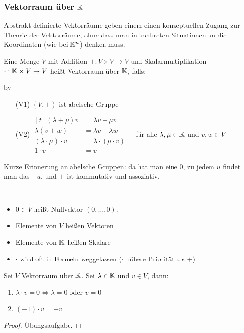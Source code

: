 \subsubsection{Vektorraum über $ \mathbb K $}

Abstrakt definierte Vektorräume geben einem einen konzeptuellen Zugang zur Theorie der Vektorräume, ohne dass man in konkreten Situationen an die Koordinaten (wie bei $\mathbb K^n$) denken muss. 

Eine Menge $ V $ mit Addition $ + : V \times V \to V  $ und Skalarmultiplikation $ \cdot : \mathbb K \times V \to V $ heißt Vektorraum über $ \mathbb K $, falls:

\advance\myindent by \the{}

\begin{itemize}[leftmargin=\myindent]
	\item[(V1)]
		$ (V,+) $ ist abelsche Gruppe
	\item[(V2)]
		$ \begin{aligned}[t]
			(\lambda + \mu)v &= \lambda v + \mu v & \\
			\lambda (v + w) &= \lambda v + \lambda w \\
			(\lambda \cdot \mu) \cdot v &= \lambda \cdot (\mu \cdot v) \\
			1 \cdot v &= v
		\end{aligned} $
		für alle $\lambda, \mu \in \mathbb K$ und $v, w\in V$
\end{itemize}

Kurze Erinnerung an abelsche Gruppen: da hat man eine $0$, zu jedem $u$ findet man das $-u$, und $+$ ist kommutativ und assoziativ. 


\begin{bem}\
\begin{itemize}
	\item
		$ 0 \in V $ heißt Nullvektor $ (0, \ldots, 0) $.
	\item
		Elemente von $ V $ heißen Vektoren
	\item
		Elemente von $ \mathbb K $ heißen Skalare
	\item
		$ \cdot $ wird oft in Formeln weggelassen ($ \cdot $ höhere Priorität als $ + $)
\end{itemize}
\end{bem}

\begin{propn}
	Sei $ V $ Vektorraum über $ \mathbb K $. Sei $ \lambda \in \mathbb K $ und $ v \in V $, dann:
	\begin{enumerate}
		\item
			$ \lambda \cdot v = 0 \Leftrightarrow  \lambda = 0 $ oder $ v=0 $
		\item
			$ (-1) \cdot v = -v $
	\end{enumerate}
\end{propn}
\begin{proof}
	Übungsaufgabe.
\end{proof}

